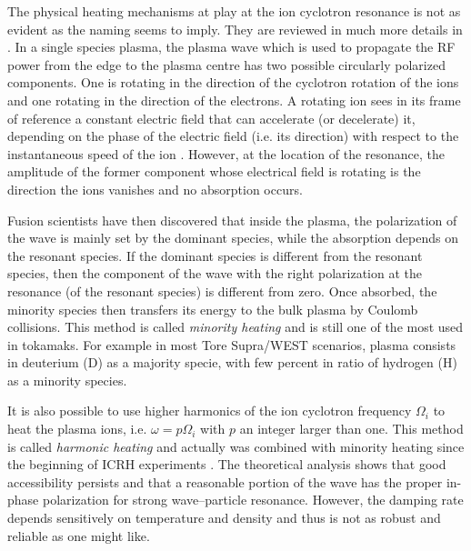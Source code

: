 
The physical heating mechanisms at play at the ion cyclotron resonance is not as evident as the naming seems to imply. They are reviewed in much more details in . In a single species plasma, the plasma wave which is used to propagate the RF power from the edge to the plasma centre has two possible circularly polarized components. One is rotating in the direction of the cyclotron rotation of the ions and one rotating in the direction of the electrons. A rotating ion sees in its frame of reference a constant electric field that can accelerate (or decelerate) it, depending on the phase of the electric field (i.e. its direction) with respect to the instantaneous speed of the ion . However, at the location of the resonance, the amplitude of the former component whose electrical field is rotating is the direction the ions vanishes and no absorption occurs. 

Fusion scientists have then discovered that inside the plasma, the polarization of the wave is mainly set by the dominant species, while the absorption depends on the resonant species. If the dominant species is different from the resonant species, then the component of the wave with the right polarization at the resonance (of the resonant species) is different from zero. Once absorbed, the minority species then transfers its energy to the bulk plasma by Coulomb collisions. This method is called \textit{minority heating} and is still one of the most used in tokamaks. For example in most Tore Supra/WEST scenarios, plasma consists in deuterium (D) as a majority specie, with few percent in ratio of hydrogen (H) as a minority species. 

It is also possible to use higher harmonics of the ion cyclotron frequency $\Omega_i$ to heat the plasma ions, i.e. $\omega = p \Omega_{i}$ with $p$ an integer larger than one. This method is called \textit{harmonic heating} and actually was combined with minority heating since the beginning of ICRH experiments . The theoretical analysis shows that good accessibility persists and that a reasonable portion of the wave has the proper in-phase polarization for strong wave–particle resonance. However, the damping rate depends sensitively on temperature and density and thus is not as robust and reliable as one might like\cite{Freidberg2007}. 

